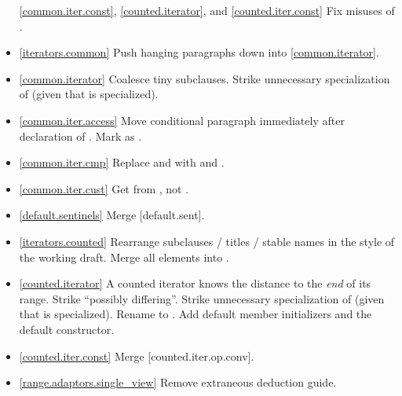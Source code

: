 \begin{itemize}
  \ref{common.iter.const}, \ref{counted.iterator},
  and \ref{counted.iter.const} Fix misuses of .
\item \ref{iterators.common} Push hanging paragraphs down
  into \ref{common.iterator}.
\item \ref{common.iterator} Coalesce tiny subclauses. Strike unnecessary
  specialization of 
  (given that  is specialized).
\item \ref{common.iter.access} Move conditional  paragraph
  immediately after declaration of .
  Mark  as .
\item \ref{common.iter.cmp} Replace  and  with
   and .
\item \ref{common.iter.cust} Get  from , not .
\item \ref{default.sentinels} Merge [default.sent].
\item \ref{iterators.counted} Rearrange subclauses / titles / stable names
  in the style of the working draft. Merge all \returns elements into \effects.
\item \ref{counted.iterator} A counted iterator knows the distance to the
  \textit{end} of its range. Strike ``possibly differing''.
  Strike unnecessary specialization of 
  (given that  is specialized).
  Rename  to .
  Add default member initializers and  the default constructor.
\item \ref{counted.iter.const} Merge [counted.iter.op.conv].
\item \ref{range.adaptors.single_view} Remove extraneous 
  deduction guide.
\end{itemize}

